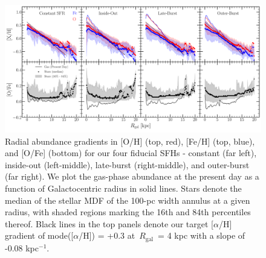 \documentclass[fleqn, usenatbib]{mnras}
\begin{document}
\begin{figure} 
\centering 
\includegraphics[scale = 0.32]{metallicity_gradient.pdf} 
\caption{Radial abundance gradients in [O/H] (top, red), [Fe/H] (top, blue), 
and [O/Fe] (bottom) for our four fiducial SFHs - constant (far left), 
inside-out (left-middle), late-burst (right-middle), and outer-burst (far 
right). We plot the gas-phase abundance at the present day as a function of 
Galactocentric radius in solid lines. Stars denote the median of the stellar 
MDF of the 100-pc width annulus at a given radius, with shaded regions marking 
the 16th and 84th percentiles thereof. Black lines in the top panels denote our 
target [$\alpha$/H] gradient of mode([$\alpha$/H]) = +0.3 at~$R_\text{gal}$~= 
4 kpc with a slope of -0.08 kpc$^{-1}$. } 
\label{fig:metallicity_gradient} 
\end{figure} 
\end{document}
